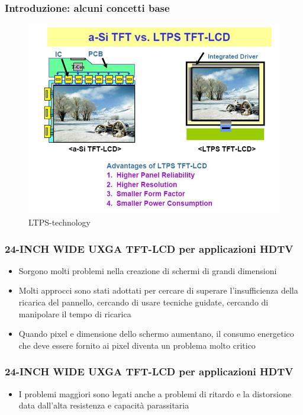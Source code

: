 \documentclass[12pt]{beamer}
\begin{document}
	\begin{frame}
		\frametitle{Introduzione: alcuni concetti base}
		\begin{figure}
			\centering
			\includegraphics[width=1\linewidth]{IMMAGINI/ltps-(technology)}
			\caption{LTPS-technology}
			\label{fig:ltps-technology}
		\end{figure}
	\end{frame}
	\begin{frame}
		\frametitle{24-INCH WIDE UXGA TFT-LCD per applicazioni HDTV}
		\begin{itemize}
			\item Sorgono molti problemi nella creazione di schermi di grandi dimensioni
			\pause
			\item Molti approcci sono stati adottati per cercare di superare l’insufficienza della ricarica del pannello,
			cercando di usare tecniche guidate, cercando di manipolare il tempo di ricarica
			\pause
			\item Quando pixel e dimensione dello schermo aumentano, il consumo energetico che deve essere fornito ai pixel diventa un problema molto critico
		\end{itemize}
	\end{frame}
	\begin{frame}
		\frametitle{24-INCH WIDE UXGA TFT-LCD per applicazioni HDTV}
		\begin{itemize}
			\item I problemi maggiori sono legati anche a problemi di ritardo e la distorsione data dall'alta resistenza e capacità parassitaria
		\end{itemize}
	\end{frame}
\end{document}
